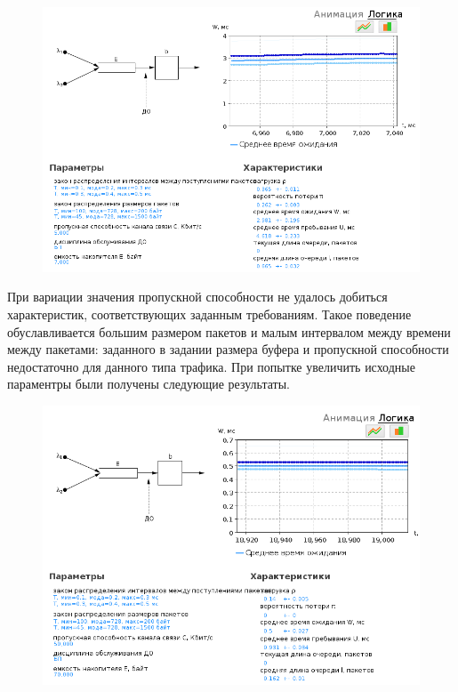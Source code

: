 \documentclass[12pt, a4paper] {ncc}
\begin{document}
		\begin{figure}[h!]
			\includegraphics[scale=0.5]{./img/fifo_5000_7000.png}
		\end{figure}
		При вариации значения пропускной способности не удалось добиться характеристик, соответствующих
		заданным требованиям. Такое поведение обуславливается большим размером пакетов и малым интервалом
		между времени между пакетами: заданного в задании размера буфера и пропускной способности недостаточно
		для данного типа трафика. При попытке увеличить исходные параментры были получены следующие результаты.
		\begin{figure}[h!]
			\includegraphics[scale=0.5]{./img/fifo_50000_70000.png}
		\end{figure}
\end{document}
